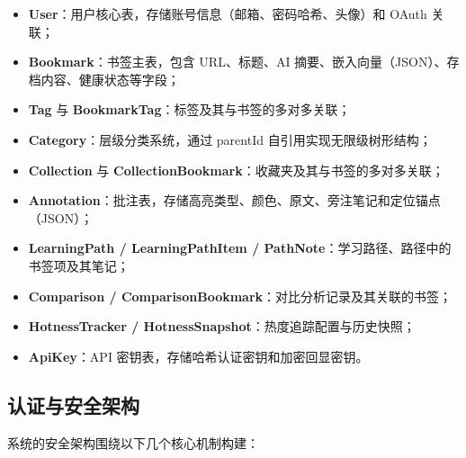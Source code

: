\documentclass[12pt,a4paper]{ctexart}
\begin{document}

\begin{itemize}
  \item \textbf{User}：用户核心表，存储账号信息（邮箱、密码哈希、头像）和 OAuth 关联；
  \item \textbf{Bookmark}：书签主表，包含 URL、标题、AI 摘要、嵌入向量（JSON）、存档内容、健康状态等字段；
  \item \textbf{Tag} 与 \textbf{BookmarkTag}：标签及其与书签的多对多关联；
  \item \textbf{Category}：层级分类系统，通过 parentId 自引用实现无限级树形结构；
  \item \textbf{Collection} 与 \textbf{CollectionBookmark}：收藏夹及其与书签的多对多关联；
  \item \textbf{Annotation}：批注表，存储高亮类型、颜色、原文、旁注笔记和定位锚点（JSON）；
  \item \textbf{LearningPath / LearningPathItem / PathNote}：学习路径、路径中的书签项及其笔记；
  \item \textbf{Comparison / ComparisonBookmark}：对比分析记录及其关联的书签；
  \item \textbf{HotnessTracker / HotnessSnapshot}：热度追踪配置与历史快照；
  \item \textbf{ApiKey}：API 密钥表，存储哈希认证密钥和加密回显密钥。
\end{itemize}

\subsection{认证与安全架构}

系统的安全架构围绕以下几个核心机制构建：
\end{document}
